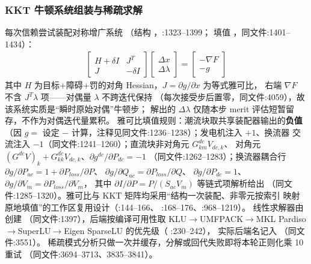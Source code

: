 \subsubsection*{KKT 牛顿系统组装与稀疏求解}
每次信赖尝试装配对称增广系统
（结构 ，:1323--1399；
填值 ，同文件:1401--1434）：
\begin{align*}
\begin{bmatrix} H+\delta I & J^{T}\\ J & -\delta I\end{bmatrix}
\begin{bmatrix}\Delta x\\ \Delta\lambda\end{bmatrix}
=
\begin{bmatrix}-\nabla F\\ -g\end{bmatrix}
\end{align*}
其中 $H$ 为目标+障碍+罚的对角 Hessian，$J=\partial g/\partial x$ 为等式雅可比，
右端 $\nabla F$ 不含 $J^{T}\lambda$ 项——对偶量 $\lambda$ 不跨迭代保持
（每次接受步后置零，同文件:4059），故该系统实质是``瞬时原始对偶''牛顿步；
解出的 $\Delta\lambda$ 仅随本步 merit 评估短暂留存，不作为对偶迭代量累积。
雅可比填值规则：潮流块取共享装配器输出的\textbf{负值}
（因 $g=$ 设定 $-$ 计算，注释见同文件:1236--1238）；发电机注入 $+1$、换流器
交流注入 $-1$（同文件:1241--1260）；直流块非对角元 $G^{dc}_{km}V_{dc,k}$、
对角元 $(G^{dc}V)_k+G^{dc}_{kk}V_{dc,k}$、$\partial g^{dc}/\partial P_{dc}=-1$
（同文件:1262--1283）；换流器耦合行
$\partial g/\partial P_{ac}=1+\partial P_{loss}/\partial P$、
$\partial g/\partial Q_{ac}=\partial P_{loss}/\partial Q$、
$\partial g/\partial P_{dc}=1$、$\partial g/\partial V_m=\partial P_{loss}/\partial V_m$，
其中 $\partial I/\partial P=P/(S_{ac}V_m)$ 等链式项解析给出
（同文件:1285--1320）。雅可比与 KKT 矩阵均采用``结构一次装配、非零元按索引
映射原地填值''的工作区复用设计（:144--166、
:168--176、:968--1219）。
线性求解器由  创建
（同文件:1397），后端按编译可用性取 KLU$\to$UMFPACK$\to$MKL
Pardiso$\to$SuperLU$\to$Eigen SparseLU 的优先级（
:230--242），
实际后端名记入 （同文件:3551）。
稀疏模式分析只做一次并缓存，分解或回代失败即将本轮正则化乘 10 重试
（同文件:3694--3713、3835--3841）。

